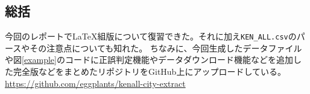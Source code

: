 \documentclass[a4j]{jarticle}
\begin{document}
\begin{multicols}{2}
  \vfill\null
  \columnbreak

  \section{総括}
  今回のレポートでLaTeX組版について復習できた。それに加え\texttt{KEN\_ALL.csv}のパースやその注意点についても知れた。
  ちなみに、今回生成したデータファイルや図\ref{example}のコードに正誤判定機能やデータダウンロード機能などを追加した完全版などをまとめたリポジトリをGitHub上にアップロードしている。
  \url{https://github.com/eggplants/kenall-city-extract}


  
  

\end{multicols}
\end{document}
